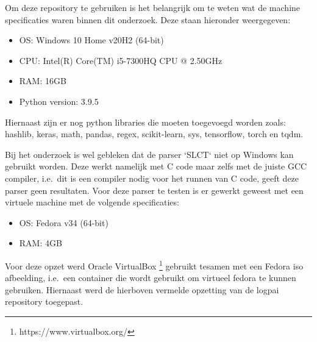 Om deze repository te gebruiken is het belangrijk om te weten wat de machine specificaties waren binnen dit onderzoek. Deze staan hieronder weergegeven:
\begin{itemize}
    \item OS: Windows 10 Home v20H2 (64-bit)
    \item CPU: Intel(R) Core(TM) i5-7300HQ CPU @ 2.50GHz
    \item RAM: 16GB
    \item Python version: 3.9.5
\end{itemize}
Hiernaast zijn er nog python libraries die moeten toegevoegd worden zoals: hashlib, keras, math, pandas, regex, scikit-learn, sys, tensorflow, torch en tqdm.

Bij het onderzoek is wel gebleken dat de parser `SLCT` niet op Windows kan gebruikt worden. Deze werkt namelijk met C code maar zelfs met de juiste GCC compiler, i.e.\ dit is een compiler nodig voor het runnen van C code, geeft deze parser geen resultaten. Voor deze parser te testen is er gewerkt geweest met een virtuele machine met de volgende specificaties:
\begin{itemize}
    \item OS: Fedora v34 (64-bit)
    \item RAM: 4GB
\end{itemize}

Voor deze opzet werd Oracle VirtualBox \footnote{https://www.virtualbox.org/} gebruikt tesamen met een Fedora iso afbeelding, i.e.\ een container die wordt gebruikt om virtueel fedora te kunnen gebruiken. Hiernaast werd de hierboven vermelde opzetting van de logpai repository toegepast.\\

